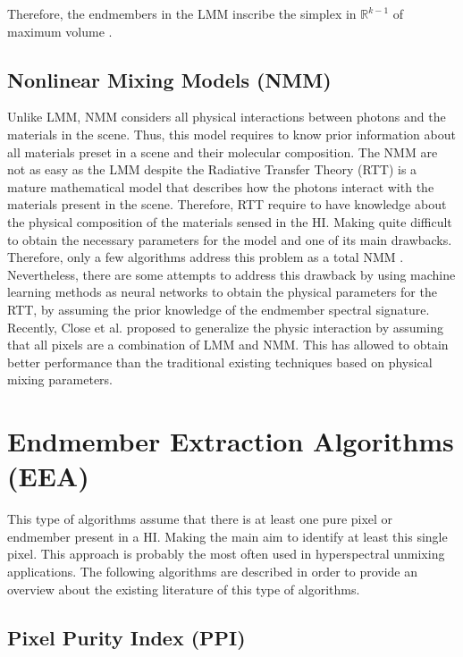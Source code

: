 \documentclass[11pt, oneside]{Thesis} %
\begin{document}
Therefore, the endmembers in the LMM inscribe the simplex in $\mathbb{R}^{k-1}$ of 
maximum volume \cite{NFINDR}.


\subsection{Nonlinear Mixing Models (NMM)}


Unlike LMM, NMM considers all physical interactions between photons and the 
materials in the scene. Thus, this model requires to know prior information 
about all materials preset in a scene and their molecular composition. The NMM are 
not as easy as the LMM despite the Radiative Transfer Theory (RTT) \cite{RTT} is a 
mature mathematical model that describes how the photons interact with the 
materials present in the scene. Therefore, RTT require to have knowledge 
about the physical composition of the materials sensed in the HI. Making 
quite difficult to obtain the necessary parameters for the model and one of 
its main drawbacks. Therefore, only a few algorithms address this problem as 
a total NMM \cite{BioucasSurvey}. Nevertheless, there are some attempts 
\cite{NeuralNetworksPlaza,NeuralNetworksLicciardi} to address this drawback by 
using machine learning methods as neural networks 
\cite{NonLinear,NeuralNetworksPlaza,NeuralNetworksLicciardi} to obtain the 
physical parameters for the RTT, by assuming the prior knowledge of the endmember 
spectral signature. Recently, Close et al. \cite{CloseGader} proposed to 
generalize the physic interaction by assuming that all pixels are a 
combination of LMM and NMM. This has allowed to obtain better performance than 
the traditional existing techniques based on physical mixing parameters.


\section{Endmember Extraction Algorithms (EEA)}

This type of algorithms assume that there is at least one pure pixel or 
endmember present in a HI. Making the main aim to identify at least this 
single pixel. This approach is probably the most often used in 
hyperspectral unmixing applications. The following algorithms are 
described in order to provide an overview about the existing literature 
of this type of algorithms.\\

\subsection{Pixel Purity Index (PPI) \cite{PPI}} 
\end{document}
